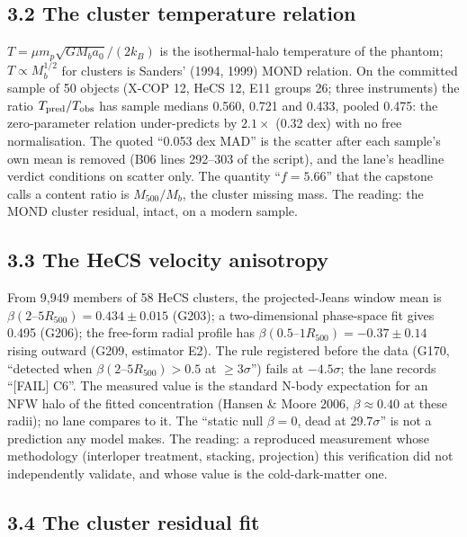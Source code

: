 \documentclass[
  11pt,
]{article}
\begin{document}
\subsection{3.2 The cluster temperature
relation}\label{the-cluster-temperature-relation}

\(T = \mu m_p \sqrt{G M_b a_0}/(2 k_B)\) is the isothermal-halo
temperature of the phantom; \(T \propto M_b^{1/2}\) for clusters is
Sanders' (1994, 1999) MOND relation. On the committed sample of 50
objects (X-COP 12, HeCS 12, E11 groups 26; three instruments) the ratio
\(T_{\rm pred}/T_{\rm obs}\) has sample medians 0.560, 0.721 and 0.433,
pooled 0.475: the zero-parameter relation under-predicts by
\(2.1\times\) (0.32 dex) with no free normalisation. The quoted ``0.053
dex MAD'' is the scatter after each sample's own mean is removed (B06
lines 292--303 of the script), and the lane's headline verdict
conditions on scatter only. The quantity ``\(f = 5.66\)'' that the
capstone calls a content ratio is \(M_{500}/M_b\), the cluster missing
mass. The reading: the MOND cluster residual, intact, on a modern
sample.

\subsection{3.3 The HeCS velocity
anisotropy}\label{the-hecs-velocity-anisotropy}

From 9,949 members of 58 HeCS clusters, the projected-Jeans window mean
is \(\beta(2\text{–}5R_{500}) = 0.434 \pm 0.015\) (G203); a
two-dimensional phase-space fit gives 0.495 (G206); the free-form radial
profile has \(\beta(0.5\text{–}1R_{500}) = -0.37 \pm 0.14\) rising
outward (G209, estimator E2). The rule registered before the data (G170,
``detected when \(\beta(2\text{–}5R_{500}) > 0.5\) at
\(\geq 3\sigma\)'') fails at \(-4.5\sigma\); the lane records
``{[}FAIL{]} C6''. The measured value is the standard N-body expectation
for an NFW halo of the fitted concentration (Hansen \& Moore 2006,
\(\beta \approx 0.40\) at these radii); no lane compares to it. The
``static null \(\beta = 0\), dead at 29.7\(\sigma\)'' is not a
prediction any model makes. The reading: a reproduced measurement whose
methodology (interloper treatment, stacking, projection) this
verification did not independently validate, and whose value is the
cold-dark-matter one.

\subsection{3.4 The cluster residual
fit}\label{the-cluster-residual-fit}
\end{document}
